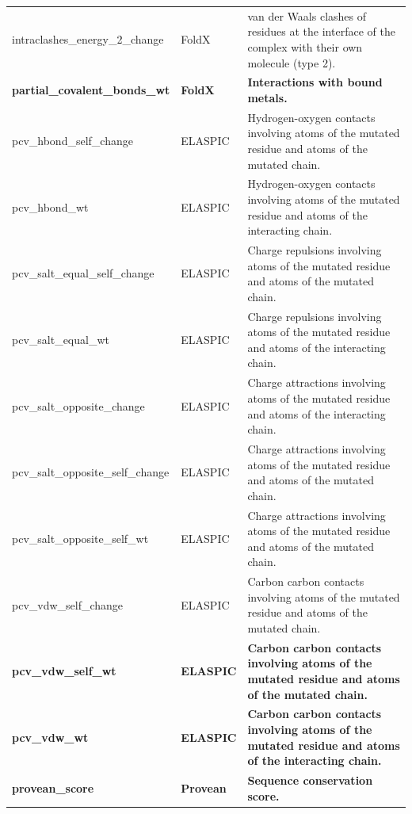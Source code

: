 \begin{table}[tb]
\begin{tabular}{ l | l | p{8cm} }
		intraclashes\_energy\_2\_change       & FoldX            & van der Waals clashes of residues at the interface of the complex with their own molecule (type 2).        \\
		\textbf{partial\_covalent\_bonds\_wt} & \textbf{FoldX}   & \textbf{Interactions with bound metals.}                                                                   \\
		pcv\_hbond\_self\_change              & ELASPIC          & Hydrogen-oxygen contacts involving atoms of the mutated residue and atoms of the mutated chain.            \\
		pcv\_hbond\_wt                        & ELASPIC          & Hydrogen-oxygen contacts involving atoms of the mutated residue and atoms of the interacting chain.        \\
		pcv\_salt\_equal\_self\_change        & ELASPIC          & Charge repulsions involving atoms of the mutated residue and atoms of the mutated chain.                   \\
		pcv\_salt\_equal\_wt                  & ELASPIC          & Charge repulsions involving atoms of the mutated residue and atoms of the interacting chain.               \\
		pcv\_salt\_opposite\_change           & ELASPIC          & Charge attractions involving atoms of the mutated residue and atoms of the interacting chain.              \\
		pcv\_salt\_opposite\_self\_change     & ELASPIC          & Charge attractions involving atoms of the mutated residue and atoms of the mutated chain.                  \\
		pcv\_salt\_opposite\_self\_wt         & ELASPIC          & Charge attractions involving atoms of the mutated residue and atoms of the mutated chain.                  \\
		pcv\_vdw\_self\_change                & ELASPIC          & Carbon carbon contacts involving atoms of the mutated residue and atoms of the mutated chain.              \\
		\textbf{pcv\_vdw\_self\_wt}           & \textbf{ELASPIC} & \textbf{Carbon carbon contacts involving atoms of the mutated residue and atoms of the mutated chain.}     \\
		\textbf{pcv\_vdw\_wt}                 & \textbf{ELASPIC} & \textbf{Carbon carbon contacts involving atoms of the mutated residue and atoms of the interacting chain.} \\
		\textbf{provean\_score}               & \textbf{Provean} & \textbf{Sequence conservation score.}                                                                      \\

\end{tabular}
\end{table}

